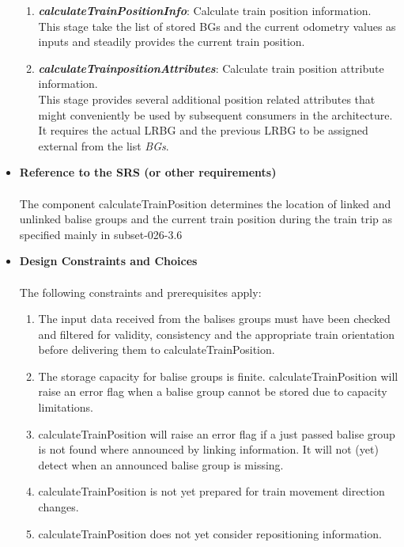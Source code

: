 \begin{itemize}
\begin{enumerate}
\item \textbf{\textit{calculateTrainPositionInfo}}: Calculate train position information.\\
This stage take the list of stored BGs and the current odometry values as inputs and steadily provides the current train position. 

\item \textbf{\textit{calculateTrainpositionAttributes}}: Calculate train position attribute information.\\
This stage provides several additional position related attributes that might conveniently be used by subsequent consumers in the architecture. It requires the actual LRBG and the previous LRBG to be assigned external from the list \textit{BGs}. 

\end{enumerate}

\item \textbf{Reference to the SRS (or other requirements)}\\
\\
The component calculateTrainPosition determines the location of linked and unlinked balise groups and the current train position during the train trip as specified mainly in subset-026-3.6

\item \textbf{Design Constraints and Choices}\\
\\
The following constraints and prerequisites apply:

\begin{enumerate}
\item The input data received from the balises groups must have been checked and filtered for validity, consistency and the appropriate train orientation before delivering them to calculateTrainPosition. 
\item The storage capacity for balise groups is finite. calculateTrainPosition will raise an error flag when a balise group cannot be stored due to capacity limitations.
\item calculateTrainPosition will raise an error flag if a just passed balise group is not found where announced by linking information. It will not (yet) detect when an announced balise group is missing. 
\item calculateTrainPosition is not yet prepared for train movement direction changes. 
\item calculateTrainPosition does not yet consider repositioning information.
\end{enumerate}

\end{itemize}

